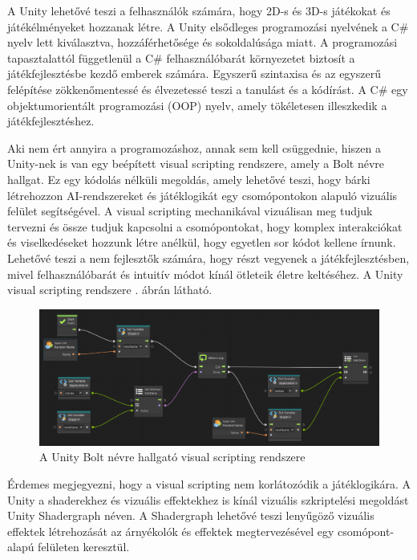 A Unity lehetővé teszi a felhasználók számára, hogy 2D-s és 3D-s játékokat és játékélményeket hozzanak létre. A Unity elsődleges programozási nyelvének a C\# nyelv lett kiválasztva, hozzáférhetősége és sokoldalúsága miatt. A programozási tapasztalattól függetlenül a C\# felhasználóbarát környezetet biztosít a játékfejlesztésbe kezdő emberek számára. Egyszerű szintaxisa és az egyszerű felépítése zökkenőmentessé és élvezetessé teszi a tanulást és a kódírást. A C\# egy objektumorientált programozási (OOP) nyelv, amely tökéletesen illeszkedik a játékfejlesztéshez. \cite{unity2}

Aki nem ért annyira a programozáshoz, annak sem kell csüggednie, hiszen a Unity-nek is van egy beépített visual scripting rendszere, amely a Bolt névre hallgat. Ez egy kódolás nélküli megoldás, amely lehetővé teszi, hogy bárki létrehozzon AI-rendszereket és játéklogikát egy csomópontokon alapuló vizuális felület segítségével. A visual scripting mechanikával vizuálisan meg tudjuk tervezni és össze tudjuk kapcsolni a csomópontokat, hogy komplex interakciókat és viselkedéseket hozzunk létre anélkül, hogy egyetlen sor kódot kellene írnunk. Lehetővé teszi a nem fejlesztők számára, hogy részt vegyenek a játékfejlesztésben, mivel felhasználóbarát és intuitív módot kínál ötleteik életre keltéséhez. \cite{unity2} A Unity visual scripting rendszere . ábrán látható.

\begin{figure}[ht]
\centering
\includegraphics[scale = 0.3]{images/visual_scripting_unity.png}
\caption{A Unity Bolt névre hallgató visual scripting rendszere \cite{unity1}}
\label{fig:unityvisualscripting}
\end{figure}

Érdemes megjegyezni, hogy a visual scripting nem korlátozódik a játéklogikára. A Unity a shaderekhez és vizuális effektekhez is kínál vizuális szkriptelési megoldást Unity Shadergraph néven. A Shadergraph lehetővé teszi lenyűgöző vizuális effektek létrehozását az árnyékolók és effektek megtervezésével egy csomópont-alapú felületen keresztül. \cite{unity2}

